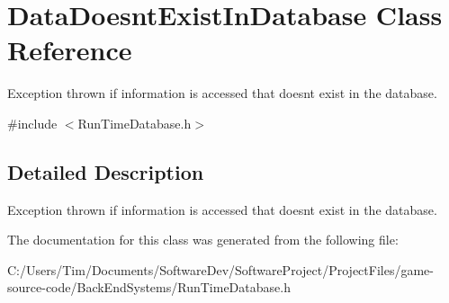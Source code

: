 \hypertarget{class_data_doesnt_exist_in_database}{}\section{Data\+Doesnt\+Exist\+In\+Database Class Reference}
\label{class_data_doesnt_exist_in_database}


Exception thrown if information is accessed that doesnt exist in the database.  




{\ttfamily \#include $<$Run\+Time\+Database.\+h$>$}



\subsection{Detailed Description}
Exception thrown if information is accessed that doesnt exist in the database. 

The documentation for this class was generated from the following file\+:\begin{DoxyCompactItemize}
\item 
C\+:/\+Users/\+Tim/\+Documents/\+Software\+Dev/\+Software\+Project/\+Project\+Files/game-\/source-\/code/\+Back\+End\+Systems/Run\+Time\+Database.\+h\end{DoxyCompactItemize}
